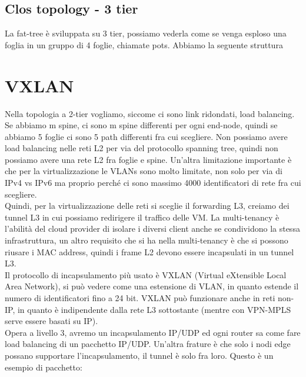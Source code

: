 \documentclass[12pt, oneside]{extbook} %
\begin{document}
\subsection{Clos topology - 3 tier}
La fat-tree è sviluppata su 3 tier, possiamo vederla come se venga esploso una foglia in un gruppo di 4 foglie, chiamate pots. Abbiamo la seguente struttura
\section{VXLAN}
Nella topologia a 2-tier vogliamo, siccome ci sono link ridondati, load balancing. Se abbiamo m spine, ci sono m spine differenti per ogni end-node, quindi se abbiamo 5 foglie ci sono 5 path differenti fra cui scegliere. Non possiamo avere load balancing nelle reti L2 per via del protocollo spanning tree, quindi non possiamo avere una rete L2 fra foglie e spine. Un'altra limitazione importante è che per la virtualizzazione le VLANs sono molto limitate, non solo per via di IPv4 vs IPv6 ma proprio perché ci sono massimo 4000 identificatori di rete fra cui scegliere.\\Quindi, per la virtualizzazione delle reti si sceglie il forwarding L3, creiamo dei tunnel L3 in cui possiamo redirigere il traffico delle VM. La multi-tenancy è l'abilità del cloud provider di isolare i diversi client anche se condividono la stessa infrastruttura, un altro requisito che si ha nella multi-tenancy è che si possono riusare i MAC address, quindi i frame L2 devono essere incapsulati in un tunnel L3.\\Il protocollo di incapsulamento più usato è VXLAN (Virtual eXtensible Local Area Network), si può vedere come una estensione di VLAN, in quanto estende il numero di identificatori fino a 24 bit. VXLAN può funzionare anche in reti non-IP, in quanto è indipendente dalla rete L3 sottostante (mentre con VPN-MPLS serve essere basati su IP).\\Opera a livello 3, avremo un incapsulamento IP/UDP ed ogni router sa come fare load balancing di un pacchetto IP/UDP. Un'altra frature è che solo i nodi edge possano supportare l'incapsulamento, il tunnel è solo fra loro. Questo è un esempio di pacchetto:\\
\end{document}
